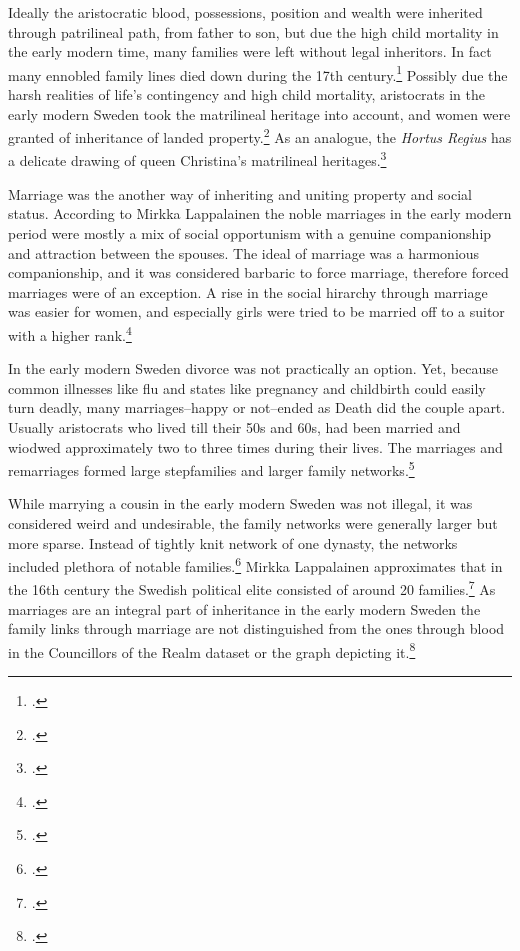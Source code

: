 Ideally the aristocratic blood, possessions, position and wealth were inherited through patrilineal path, from father to son, but due the high child mortality in the early modern time, many families were left without legal inheritors. In fact many ennobled family lines died down during the 17th century.\footcite[pp. 158-160.]{lappalainen06} Possibly due the harsh realities of life's contingency and high child mortality, aristocrats in the early modern Sweden took the matrilineal heritage into account, and women were granted of inheritance of landed property.\footcites[p. 43]{lahtinen2020}[p. 40.]{lappalainen06} As an analogue, the \textit{Hortus Regius} has a delicate drawing of queen Christina's matrilineal heritages.\footcite{hortusregius}

Marriage was the another way of inheriting and uniting property and social status. According to Mirkka Lappalainen the noble marriages in the early modern period were mostly a mix of social opportunism with a genuine companionship and attraction between the spouses. The ideal of marriage was a harmonious companionship, and it was considered barbaric to force marriage, therefore forced marriages were of an exception. A rise in the social hirarchy through marriage was easier for women, and especially girls were tried to be married off to a suitor with a higher rank.\footcite[pp. 33-42.]{lappalainen06}

In the early modern Sweden divorce was not practically an option. Yet, because common illnesses like flu and states like pregnancy and childbirth could easily turn deadly, many marriages–happy or not–ended as Death did the couple apart. Usually aristocrats who lived till their 50s and 60s, had been married and wiodwed approximately two to three times during their lives. The marriages and remarriages formed large stepfamilies and larger family networks.\footcite[pp. 35-42.]{lappalainen06}

While marrying a cousin in the early modern Sweden was not illegal, it was considered weird and undesirable, the family networks were generally larger but more sparse. Instead of tightly knit network of one dynasty, the networks included plethora of notable families.\footcite[p. 40.]{lappalainen06} Mirkka Lappalainen approximates that in the 16th century the Swedish political elite consisted of around 20 families.\footcite[p. 55.]{lappalainen09} As marriages are an integral part of inheritance in the early modern Sweden the family links through marriage are not distinguished from the ones through blood in the Councillors of the Realm dataset or the graph depicting it.\footcite{councillorsDS}

